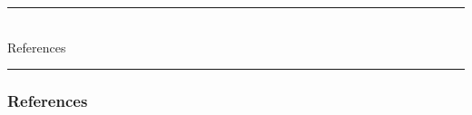 \documentclass[
    11pt,
    aspectratio=169,
]{beamer}
\begin{document}
\begin{frame}
	\begin{center}
		\vspace{2em}
		{\color{myRed!60}\rule{0.6\textwidth}{0.4pt}}\\[0.8em]
		{\large\color{myRed!80} References}\\[0.4em]
		{\color{myRed!60}\rule{0.6\textwidth}{0.4pt}}
	\end{center}
\end{frame}

\nocite{trinkenreich2025train}
\nocite{villaescusa2025denario}

\begin{frame}
	\frametitle{References}
	\printbibliography
\end{frame}
\end{document}
